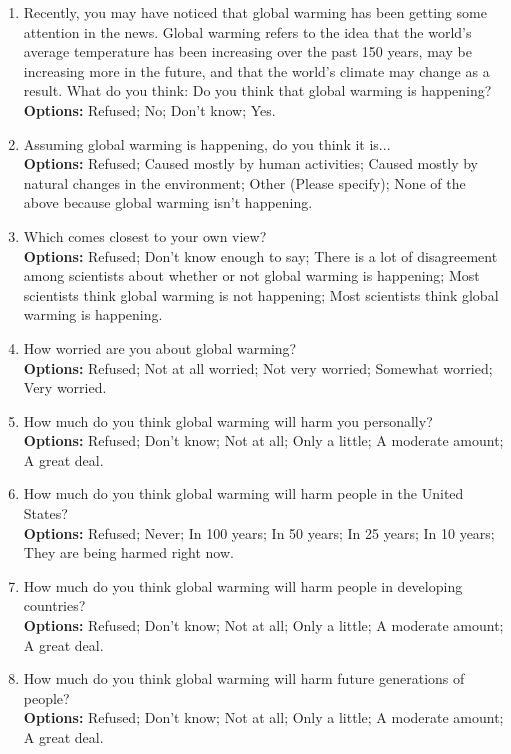 \documentclass[12pt]{article}
\begin{document}
\begin{enumerate}[label=Q\arabic*., leftmargin=*]
    \item Recently, you may have noticed that global warming has been getting some attention in the news. Global warming refers to the idea that the world’s average temperature has been increasing over the past 150 years, may be increasing more in the future, and that the world’s climate may change as a result. What do you think: Do you think that global warming is happening?\\
    \textbf{Options:} Refused; No; Don't know; Yes.
    \item Assuming global warming is happening, do you think it is... \\
    \textbf{Options:} Refused; Caused mostly by human activities; Caused mostly by natural changes in the environment; Other (Please specify); None of the above because global warming isn’t happening.
    \item Which comes closest to your own view? \\
    \textbf{Options:} Refused; Don’t know enough to say; There is a lot of disagreement among scientists about whether or not global warming is happening; Most scientists think global warming is not happening; Most scientists think global warming is happening.
    \item How worried are you about global warming? \\
    \textbf{Options:} Refused; Not at all worried; Not very worried; Somewhat worried; Very worried.
    \item How much do you think global warming will harm you personally?\\
    \textbf{Options:} Refused; Don’t know; Not at all; Only a little; A moderate amount; A great deal.
    \item How much do you think global warming will harm people in the United States?\\
    \textbf{Options:} Refused; Never; In 100 years; In 50 years; In 25 years; In 10 years; They are being harmed right now.
    \item How much do you think global warming will harm people in developing countries? \\
    \textbf{Options:} Refused; Don’t know; Not at all; Only a little; A moderate amount; A great deal.
    \item How much do you think global warming will harm future generations of people? \\
    \textbf{Options:} Refused; Don’t know; Not at all; Only a little; A moderate amount; A great deal.

\end{enumerate}
\end{document}
